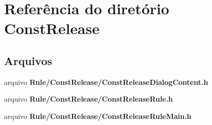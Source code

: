 \section{Referência do diretório Const\+Release}
\label{dir_22e10edcae2e207f1f0bf3730d52057f}
\subsection*{Arquivos}
\begin{DoxyCompactItemize}
\item 
arquivo {\bf Rule/\+Const\+Release/\+Const\+Release\+Dialog\+Content.\+h}
\item 
arquivo {\bf Rule/\+Const\+Release/\+Const\+Release\+Rule.\+h}
\item 
arquivo {\bf Rule/\+Const\+Release/\+Const\+Release\+Rule\+Main.\+h}
\end{DoxyCompactItemize}

